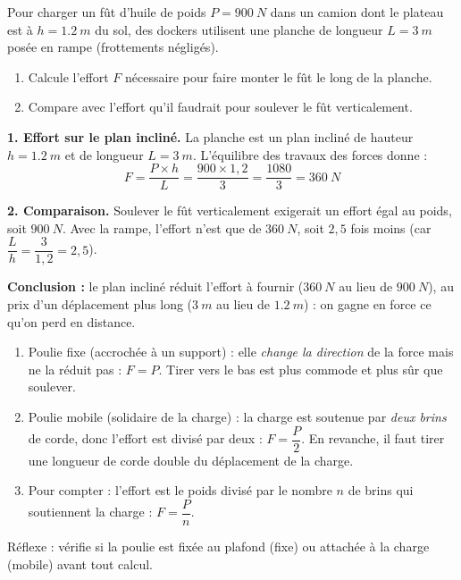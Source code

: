 \documentclass[11pt]{article}
\newcommand{\cle}[1]{{\popxbold\color{popdark}#1}}
\newcounter{popsec}
\newcounter{popsub}
\newcommand{\courssub}[1]{%
  \stepcounter{popsub}%
  \par\vspace{9pt}\noindent{\popxbold\fontsize{11.5}{13}\selectfont\color{popink}{\color{poporange}\thepopsec.\thepopsub}\hspace{6pt}#1}\par\nopagebreak\vspace{4pt}
}
\begin{document}
\begin{exoresolu}
Pour charger un fût d'huile de poids $P = \SI{900}{N}$ dans un camion dont le plateau est à $h = \SI{1,2}{m}$ du sol, des dockers utilisent une planche de longueur $L = \SI{3}{m}$ posée en rampe (frottements négligés).
\begin{enumerate}
\item Calcule l'effort $F$ nécessaire pour faire monter le fût le long de la planche.
\item Compare avec l'effort qu'il faudrait pour soulever le fût verticalement.
\end{enumerate}
\tcblower
\textbf{1. Effort sur le plan incliné.} La planche est un plan incliné de hauteur $h = \SI{1,2}{m}$ et de longueur $L = \SI{3}{m}$. L'équilibre des travaux des forces donne :
\[ F = \frac{P \times h}{L} = \frac{900 \times 1{,}2}{3} = \frac{1080}{3} = \SI{360}{N} \]

\textbf{2. Comparaison.} Soulever le fût verticalement exigerait un effort égal au poids, soit $\SI{900}{N}$. Avec la rampe, l'effort n'est que de $\SI{360}{N}$, soit $2{,}5$ fois moins (car $\dfrac{L}{h} = \dfrac{3}{1{,}2} = 2{,}5$).

\textbf{Conclusion :} le plan incliné réduit l'effort à fournir ($\SI{360}{N}$ au lieu de $\SI{900}{N}$), au prix d'un déplacement plus long ($\SI{3}{m}$ au lieu de $\SI{1,2}{m}$) : on gagne en force ce qu'on perd en distance.
\end{exoresolu}

\courssub{Méthode 4 : Étudier une poulie}

\begin{methode}
\begin{enumerate}
\item \cle{Poulie fixe} (accrochée à un support) : elle \emph{change la direction} de la force mais ne la réduit pas : $F = P$. Tirer vers le bas est plus commode et plus sûr que soulever.
\item \cle{Poulie mobile} (solidaire de la charge) : la charge est soutenue par \emph{deux brins} de corde, donc l'effort est divisé par deux : $F = \dfrac{P}{2}$. En revanche, il faut tirer une longueur de corde double du déplacement de la charge.
\item Pour compter : l'effort est le poids divisé par le nombre $n$ de brins qui soutiennent la charge : $F = \dfrac{P}{n}$.
\end{enumerate}
Réflexe : vérifie si la poulie est fixée au plafond (fixe) ou attachée à la charge (mobile) avant tout calcul.
\end{methode}
\end{document}
